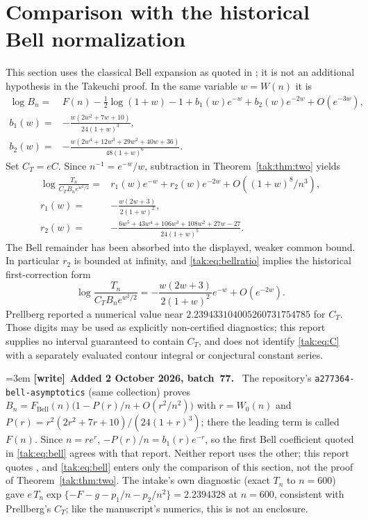 \documentclass[11pt,letterpaper]{article}
\theoremstyle{remark}\newtheorem{remark}[theorem]{Remark}
\newenvironment{writenote}[1][]{\par\smallskip\begingroup\small\emergencystretch=3em
 \noindent\textbf{[write]}\if\relax\detokenize{#1}\relax\else~\textbf{#1.}\fi\ }%
 {\par\endgroup\smallskip}
\begin{document}
\section{Comparison with the historical Bell normalization}\label{tak:sec:bell}
This section uses the classical Bell expansion as quoted in \cite[Eq.~(12)]{prellberg2000}; it is not an additional hypothesis in the Takeuchi proof. In the same variable $w=W(n)$ it is
\begin{align}
 \log B_n={}&F(n)-\frac12\log(1+w)-1+b_1(w)e^{-w}+b_2(w)e^{-2w}+O(e^{-3w}),\label{tak:eq:bell}\\
 b_1(w)={}&-\frac{w(2w^2+7w+10)}{24(1+w)^3},\nonumber\\
 b_2(w)={}&-\frac{w(2w^4+12w^3+29w^2+40w+36)}{48(1+w)^6}.\nonumber
\end{align}
Set $C_T=eC$. Since $n^{-1}=e^{-w}/w$, subtraction in Theorem~\ref{tak:thm:two} yields
\begin{align}
 \log\frac{T_n}{C_T B_ne^{w^2/2}}
  ={}&r_1(w)e^{-w}+r_2(w)e^{-2w}
          +O((1+w)^8/n^3),\label{tak:eq:bellratio}\\
 r_1(w)={}&-\frac{w(2w+3)}{2(1+w)^2},\nonumber\\
 r_2(w)={}&-\frac{6w^5+43w^4+106w^3+108w^2+27w-27}{24(1+w)^5}.\nonumber
\end{align}
The Bell remainder has been absorbed into the displayed, weaker common bound. In particular $r_2$ is bounded at infinity, and \eqref{tak:eq:bellratio} implies the historical first-correction form
\begin{equation}
 \log\frac{T_n}{C_TB_ne^{w^2/2}}
   =-\frac{w(2w+3)}{2(1+w)^2}e^{-w}+O(e^{-2w}).\label{tak:eq:firsthistorical}
\end{equation}
Prellberg reported a numerical value near $2.239433104005260731754785$ for $C_T$. Those digits may be used as explicitly non-certified diagnostics; this report supplies no interval guaranteed to contain $C_T$, and does not identify \eqref{tak:eq:C} with a separately evaluated contour integral or conjectural constant series.

\begin{writenote}[Added 2 October 2026, batch~77]
The repository's \texttt{a277364-\allowbreak bell-\allowbreak asymptotics}
(same collection) proves $B_n=F_{\mathrm{Bell}}(n)\bigl(1-P(r)/n+O(r^2/n^2)\bigr)$
with $r=W_0(n)$ and $P(r)=r^2(2r^2+7r+10)/(24(1+r)^3)$; there the leading term is
called $F(n)$. Since $n=re^r$, $-P(r)/n=b_1(r)e^{-r}$, so the first Bell
coefficient quoted in \eqref{tak:eq:bell} agrees with that report. Neither
report uses the other; this report quotes \cite[Eq.~(12)]{prellberg2000}, and
\eqref{tak:eq:bell} enters only the comparison of this section, not the proof
of Theorem~\ref{tak:thm:two}. The intake's own diagnostic (exact $T_n$ to
$n=600$) gave $e\,T_n\exp\{-F-g-p_1/n-p_2/n^2\}=2.2394328$ at $n=600$,
consistent with Prellberg's $C_T$; like the manuscript's numerics, this is not
an enclosure.
\end{writenote}
\end{document}
